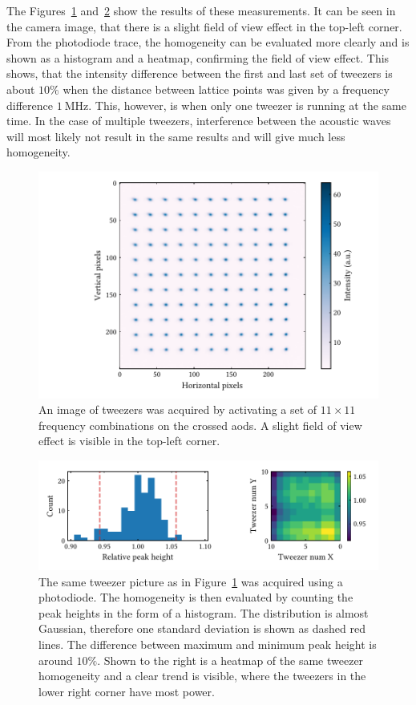 The Figures~\ref{fig:aod_grid} and~\ref{fig:aod_hom} show the results of these measurements. It can be seen in the camera image, that there is a slight field of view effect in the top-left corner. From the photodiode trace, the homogeneity can be evaluated more clearly and is shown as a histogram and a heatmap, confirming the field of view effect. This shows, that the intensity difference between the first and last set of tweezers is about $10\%$ when the distance between lattice points was given by a frequency difference $\SI{1}{\mega\hertz}$. This, however, is when only one tweezer is running at the same time. In the case of multiple tweezers, interference between the acoustic waves will most likely not result in the same results and will give much less homogeneity.

\begin{figure}[tbp]%
\centering
\includegraphics{figures/aod_grid_155.pdf}
\caption{An image of tweezers was acquired by activating a set of $11\times11$ frequency combinations on the crossed \acp{aod}. A slight field of view effect is visible in the top-left corner.}%
\label{fig:aod_grid}
\end{figure}

\begin{figure}[tbp]%
\centering
\includegraphics{figures/aod_hom_155.pdf}
\caption{The same tweezer picture as in Figure~\ref{fig:aod_grid} was acquired using a photodiode. The homogeneity is then evaluated by counting the peak heights in the form of a histogram. The distribution is almost Gaussian, therefore one standard deviation is shown as dashed red lines. The difference between maximum and minimum peak height is around $10\%$. Shown to the right is a heatmap of the same tweezer homogeneity and a clear trend is visible, where the tweezers in the lower right corner have most power.}%
\label{fig:aod_hom}
\end{figure}

